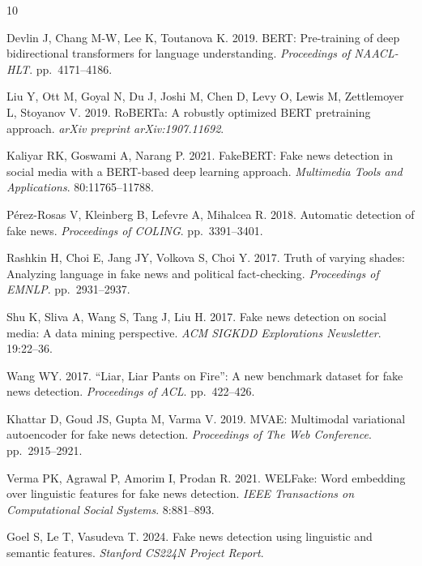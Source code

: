 \documentclass[10pt,twoside]{article}
\begin{document}
\begin{thebibliography}{10}

Devlin J, Chang M-W, Lee K, Toutanova K.
2019.
{BERT}: Pre-training of deep bidirectional transformers for
language understanding.
\emph{Proceedings of NAACL-HLT}. pp.~4171--4186.

Liu Y, Ott M, Goyal N, Du J, Joshi M, Chen D, Levy O,
Lewis M, Zettlemoyer L, Stoyanov V.
2019.
{RoBERTa}: A robustly optimized {BERT} pretraining approach.
\emph{arXiv preprint arXiv:1907.11692}.

Kaliyar RK, Goswami A, Narang P.
2021.
{FakeBERT}: Fake news detection in social media with a
{BERT}-based deep learning approach.
\emph{Multimedia Tools and Applications}. 80:11765--11788.

P{\'e}rez-Rosas V, Kleinberg B, Lefevre A, Mihalcea R.
2018.
Automatic detection of fake news.
\emph{Proceedings of COLING}. pp.~3391--3401.

Rashkin H, Choi E, Jang JY, Volkova S, Choi Y.
2017.
Truth of varying shades: Analyzing language in fake news and
political fact-checking.
\emph{Proceedings of EMNLP}. pp.~2931--2937.

Shu K, Sliva A, Wang S, Tang J, Liu H.
2017.
Fake news detection on social media: A data mining
perspective.
\emph{ACM SIGKDD Explorations Newsletter}. 19:22--36.

Wang WY.
2017.
``{Liar, Liar Pants on Fire}'': A new benchmark dataset for
fake news detection.
\emph{Proceedings of ACL}. pp.~422--426.

Khattar D, Goud JS, Gupta M, Varma V.
2019.
{MVAE}: Multimodal variational autoencoder for fake news
detection.
\emph{Proceedings of The Web Conference}. pp.~2915--2921.

Verma PK, Agrawal P, Amorim I, Prodan R.
2021.
{WELFake}: Word embedding over linguistic features for fake
news detection.
\emph{IEEE Transactions on Computational Social Systems}.
8:881--893.

Goel S, Le T, Vasudeva T.
2024.
Fake news detection using linguistic and semantic features.
\emph{Stanford CS224N Project Report}.

\end{thebibliography}
\end{document}
